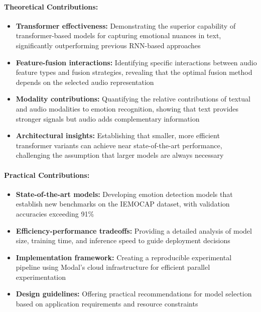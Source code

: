 \documentclass[12pt]{article}
\begin{document}
\paragraph{Theoretical Contributions:}
\begin{itemize}
    \item \textbf{Transformer effectiveness:} Demonstrating the superior capability of transformer-based models for capturing emotional nuances in text, significantly outperforming previous RNN-based approaches
    
    \item \textbf{Feature-fusion interactions:} Identifying specific interactions between audio feature types and fusion strategies, revealing that the optimal fusion method depends on the selected audio representation
    
    \item \textbf{Modality contributions:} Quantifying the relative contributions of textual and audio modalities to emotion recognition, showing that text provides stronger signals but audio adds complementary information
    
    \item \textbf{Architectural insights:} Establishing that smaller, more efficient transformer variants can achieve near state-of-the-art performance, challenging the assumption that larger models are always necessary
\end{itemize}

\paragraph{Practical Contributions:}
\begin{itemize}
    \item \textbf{State-of-the-art models:} Developing emotion detection models that establish new benchmarks on the IEMOCAP dataset, with validation accuracies exceeding 91\%
    
    \item \textbf{Efficiency-performance tradeoffs:} Providing a detailed analysis of model size, training time, and inference speed to guide deployment decisions
    
    \item \textbf{Implementation framework:} Creating a reproducible experimental pipeline using Modal's cloud infrastructure for efficient parallel experimentation
    
    \item \textbf{Design guidelines:} Offering practical recommendations for model selection based on application requirements and resource constraints
\end{itemize}
\end{document}
